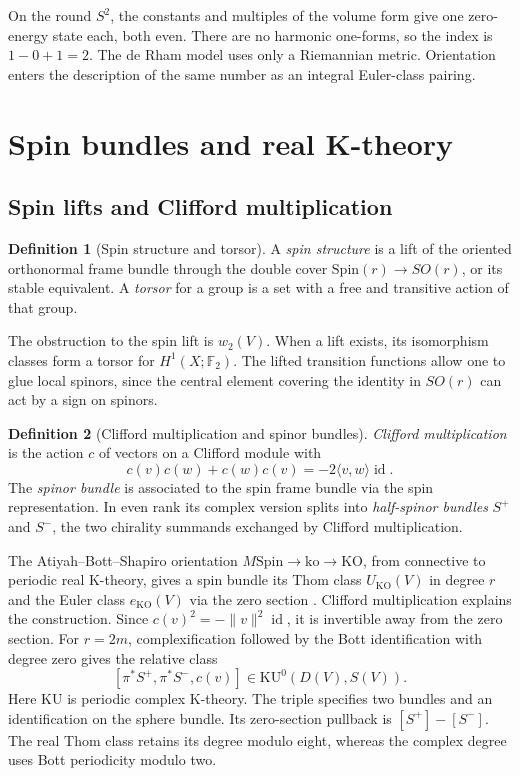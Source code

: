 \documentclass[11pt]{article}
\theoremstyle{definition}
\newtheorem{defn}{Definition}[section]
\newcommand{\KO}{\mathrm{KO}}
\newcommand{\KU}{\mathrm{KU}}
\newcommand{\ko}{\mathrm{ko}}
\newcommand{\F}{\mathbb F}
\newcommand{\Spin}{\mathrm{Spin}}
\begin{document}
On the round \(S^2\), the constants and multiples of the volume form give one zero-energy state each, both even. There are no harmonic one-forms, so the index is \(1-0+1=2\). The de Rham model uses only a Riemannian metric. Orientation enters the description of the same number as an integral Euler-class pairing.

\section{Spin bundles and real K-theory}
\subsection{Spin lifts and Clifford multiplication}
\begin{defn}[Spin structure and torsor]
A \emph{spin structure} is a lift of the oriented orthonormal frame bundle through the double cover \(\Spin(r)\to SO(r)\), or its stable equivalent. A \emph{torsor} for a group is a set with a free and transitive action of that group.
\end{defn}
The obstruction to the spin lift is \(w_2(V)\). When a lift exists, its isomorphism classes form a torsor for \(H^1(X;\F_2)\). The lifted transition functions allow one to glue local spinors, since the central element covering the identity in \(SO(r)\) can act by a sign on spinors.

\begin{defn}[Clifford multiplication and spinor bundles]
\emph{Clifford multiplication} is the action \(c\) of vectors on a Clifford module with
\[
 c(v)c(w)+c(w)c(v)=-2\langle v,w\rangle\operatorname{id}.
\]
The \emph{spinor bundle} is associated to the spin frame bundle via the spin representation. In even rank its complex version splits into \emph{half-spinor bundles} \(S^+\) and \(S^-\), the two chirality summands exchanged by Clifford multiplication.
\end{defn}

The Atiyah--Bott--Shapiro orientation \(M\Spin\to\ko\to\KO\), from connective to periodic real K-theory, gives a spin bundle its Thom class \(U_{\KO}(V)\) in degree \(r\) and the Euler class \(e_{\KO}(V)\) via the zero section \cite{ABS,AHR}. Clifford multiplication explains the construction. Since \(c(v)^2=-\|v\|^2\operatorname{id}\), it is invertible away from the zero section. For \(r=2m\), complexification followed by the Bott identification with degree zero gives the relative class
\[
 [\pi^*S^+,\pi^*S^-,c(v)]\in\KU^0(D(V),S(V)).
\]
Here \(\KU\) is periodic complex K-theory. The triple specifies two bundles and an identification on the sphere bundle. Its zero-section pullback is \([S^+]-[S^-]\). The real Thom class retains its degree modulo eight, whereas the complex degree uses Bott periodicity modulo two.
\end{document}
